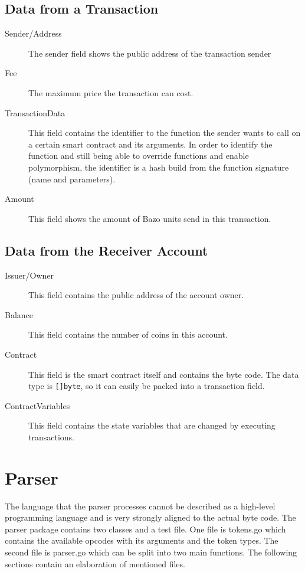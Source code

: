 \subsection{Data from a Transaction}
\begin{description}
  \item[Sender/Address] The sender field shows the public address of the transaction sender 
  \item[Fee] The maximum price the transaction can cost.
  \item[TransactionData] This field contains the identifier to the function the sender wants to call on a certain smart contract and its arguments. In order to identify the function and still being able to override functions and enable polymorphism, the identifier is a hash build from the function signature (name and parameters).
  \item[Amount] This field shows the amount of Bazo units send in this transaction.
\end{description}

\subsection{Data from the Receiver Account}
\begin{description}
  \item[Issuer/Owner] This field contains the public address of the account owner.
  \item[Balance] This field contains the number of coins in this account.
  \item[Contract] This field is the smart contract itself and contains the byte code. The data type is \texttt{[]byte}, so it can easily be packed into a transaction field.
  \item[ContractVariables] This field contains the state variables that are changed by executing transactions.
\end{description}

\section{Parser}
The language that the parser processes cannot be described as a high-level programming language and is very strongly aligned to the actual byte code. The parser package contains two classes and a test file. One file is tokens.go which contains the available opcodes with its arguments and the token types. The second file is parser.go which can be split into two main functions. The following sections contain an elaboration of mentioned files.

